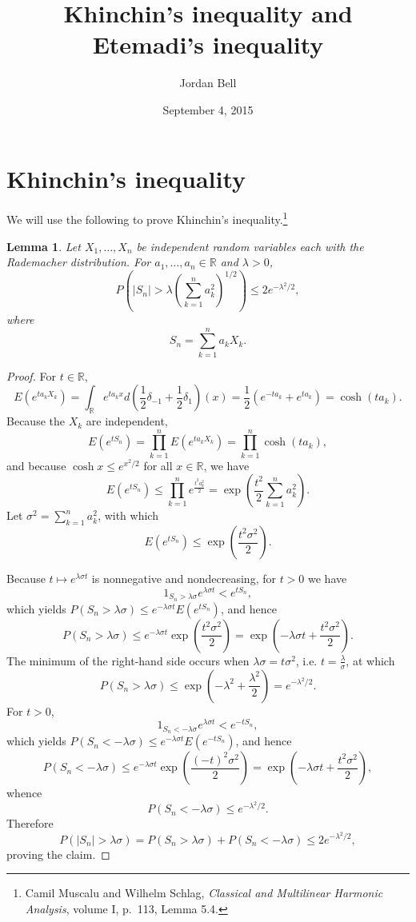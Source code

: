 \documentclass{article}
\newtheorem{lemma}[theorem]{Lemma}
\theoremstyle{definition}
\begin{document}
\title{Khinchin's inequality and Etemadi's inequality}
\author{Jordan Bell}
\date{September 4, 2015}

\maketitle



\section{Khinchin's inequality}
We will use the following to prove Khinchin's inequality.\footnote{Camil Muscalu and Wilhelm Schlag, {\em Classical and Multilinear Harmonic Analysis}, volume I,
p.~113, Lemma 5.4.}

\begin{lemma}
Let $X_1,\ldots,X_n$ be independent random variables each with the Rademacher distribution. For $a_1,\ldots,a_n \in \mathbb{R}$ and $\lambda>0$,
\[
P\left(\left|S_n \right| > \lambda \left(\sum_{k=1}^n a_k^2 \right)^{1/2}\right) \leq 2e^{-\lambda^2/2},
\]
where
\[
S_n=\sum_{k=1}^n a_k X_k.
\]
\end{lemma}
\begin{proof}
For $t \in \mathbb{R}$,
\[
E(e^{ta_k X_k}) = \int_\mathbb{R} e^{ta_kx} d\left(\frac{1}{2}\delta_{-1}+\frac{1}{2}\delta_1\right)(x)
=\frac{1}{2}(e^{-ta_k}+e^{ta_k})
=\cosh (ta_k).
\]
Because
the $X_k$ are independent,
\[
E(e^{tS_n}) = \prod_{k=1}^n E(e^{ta_k X_k})= \prod_{k=1}^n \cosh(ta_k),
\]
and because $\cosh x\leq e^{x^2/2}$ for all $x \in \mathbb{R}$, we have
\[
E(e^{tS_n}) \leq \prod_{k=1}^n e^{\frac{t^2 a_k^2}{2}}
=\exp\left(\frac{t^2}{2} \sum_{k=1}^n a_k^2\right).
\]
Let $\sigma^2=\sum_{k=1}^n a_k^2$, with which
\[
E(e^{tS_n})  \leq \exp\left(\frac{t^2 \sigma^2}{2}\right).
\]

Because $t \mapsto e^{\lambda \sigma t}$ is nonnegative and nondecreasing, for $t>0$ we have
\[
1_{S_n>\lambda \sigma} e^{\lambda \sigma t} < e^{t S_n},
\]
which yields $P(S_n>\lambda \sigma) \leq e^{-\lambda \sigma t} E(e^{tS_n})$, and
hence 
\[
P(S_n>\lambda \sigma) \leq e^{-\lambda \sigma t}  \exp\left(\frac{t^2 \sigma^2}{2}\right)
=\exp\left(-\lambda \sigma t  + \frac{t^2 \sigma^2}{2}\right).
\]
The minimum of the right-hand side occurs when $\lambda \sigma = t \sigma^2$, i.e. $t = \frac{\lambda}{\sigma}$, at which
\[
P(S_n>\lambda \sigma) \leq \exp\left(-\lambda^2 + \frac{\lambda^2}{2}\right)
=e^{-\lambda^2/2}.
\]
For $t>0$,
\[
1_{S_n<-\lambda \sigma} e^{\lambda \sigma t} < e^{-tS_n},
\]
which yields $P(S_n<-\lambda \sigma) \leq e^{-\lambda \sigma t} E(e^{-tS_n})$, and hence
\[
P(S_n<-\lambda \sigma) \leq
e^{-\lambda \sigma t} \exp\left( \frac{(-t)^2 \sigma^2}{2}\right)=
 \exp\left(-\lambda \sigma t  + \frac{t^2 \sigma^2}{2} \right),
\]
whence
\[
P(S_n<-\lambda \sigma) \leq e^{-\lambda^2/2}.
\]
Therefore
\[
P(|S_n|>\lambda \sigma) = P(S_n > \lambda \sigma)
+P(S_n<-\lambda \sigma)
\leq 2 e^{-\lambda^2/2},
\]
proving the claim.
\end{proof}
\end{document}
